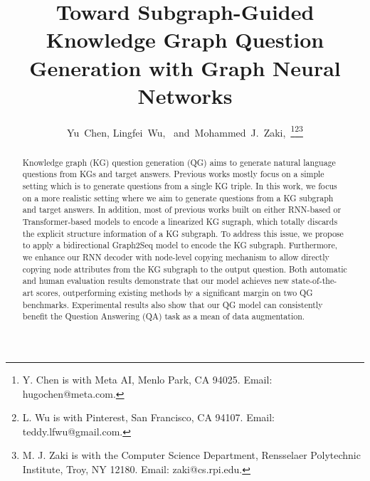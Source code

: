 \documentclass[journal]{IEEEtran}
\begin{document}
\title{Toward Subgraph-Guided Knowledge Graph Question Generation with Graph Neural Networks}


\author{Yu~Chen,
        Lingfei~Wu,~
        and~Mohammed~J.~Zaki,~\thanks{Y. Chen is with Meta AI, Menlo Park,
CA 94025. Email: hugochen@meta.com.}\thanks{L. Wu is with Pinterest, San Francisco, CA 94107. Email: teddy.lfwu@gmail.com.}\thanks{M. J. Zaki is with the Computer Science Department, Rensselaer Polytechnic Institute, Troy, NY 12180. Email: zaki@cs.rpi.edu.}}



















\maketitle

\begin{abstract}
Knowledge graph (KG) question generation (QG) aims to generate natural language questions from KGs and target answers. Previous works mostly focus on a simple setting which is to generate questions from a single KG triple. In this work, we focus on a more realistic setting where we aim to generate questions from a KG subgraph and target answers. In addition, most of previous works built on either RNN-based or Transformer-based models to encode a linearized KG sugraph, which totally discards the explicit structure information of a KG subgraph. To address this issue, we propose to apply a bidirectional Graph2Seq model to encode the KG subgraph. Furthermore, we enhance our RNN decoder with node-level copying mechanism to allow directly copying node attributes from the KG subgraph to the output question. Both automatic and human evaluation results demonstrate that our model achieves new state-of-the-art scores, outperforming existing methods by a significant margin on two QG benchmarks. Experimental results also show that our QG model can consistently benefit the Question Answering (QA) task as a mean of data augmentation.
\end{abstract}
\end{document}
